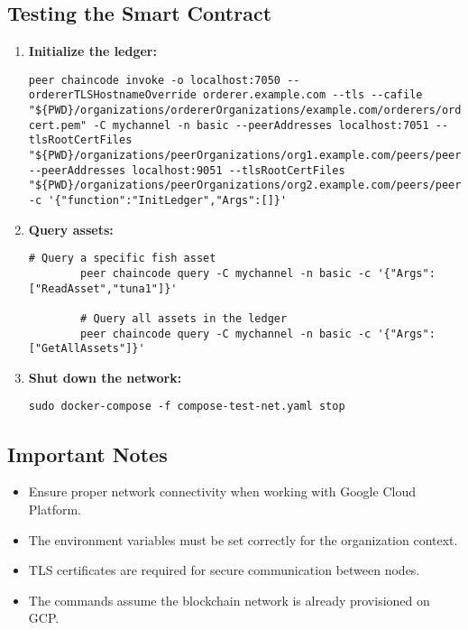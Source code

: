\subsection{Testing the Smart Contract}
\begin{enumerate}
	\item \textbf{Initialize the ledger:}
	\begin{lstlisting}[style=appendixstyle, breaklines=true, caption={Invoke InitLedger}, label={lst:init-ledger}]
		peer chaincode invoke -o localhost:7050 --ordererTLSHostnameOverride orderer.example.com --tls --cafile "${PWD}/organizations/ordererOrganizations/example.com/orderers/orderer.example.com/msp/tlscacerts/tlsca.example.com-cert.pem" -C mychannel -n basic --peerAddresses localhost:7051 --tlsRootCertFiles "${PWD}/organizations/peerOrganizations/org1.example.com/peers/peer0.org1.example.com/tls/ca.crt" --peerAddresses localhost:9051 --tlsRootCertFiles "${PWD}/organizations/peerOrganizations/org2.example.com/peers/peer0.org2.example.com/tls/ca.crt" -c '{"function":"InitLedger","Args":[]}'
	\end{lstlisting}
	
	\item \textbf{Query assets:}
	\begin{lstlisting}[style=appendixstyle, caption={Query Fish Asset}, label={lst:query-asset}]
		# Query a specific fish asset
		peer chaincode query -C mychannel -n basic -c '{"Args":["ReadAsset","tuna1"]}'
		
		# Query all assets in the ledger
		peer chaincode query -C mychannel -n basic -c '{"Args":["GetAllAssets"]}'
	\end{lstlisting}
	
	\item \textbf{Shut down the network:}
	\begin{lstlisting}[style=appendixstyle, caption={Stop Fabric Network}, label={lst:stop-network}]
		sudo docker-compose -f compose-test-net.yaml stop
	\end{lstlisting}
\end{enumerate}

\subsection{Important Notes}
\begin{itemize}
	\item Ensure proper network connectivity when working with Google Cloud Platform.
	\item The environment variables must be set correctly for the organization context.
	\item TLS certificates are required for secure communication between nodes.
	\item The commands assume the blockchain network is already provisioned on GCP.
\end{itemize}


%

